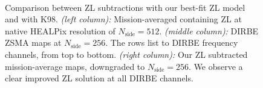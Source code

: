 \documentclass[twocolumn]{aa}
\begin{document}
\begin{figure}
    \\

    \caption{Comparison between ZL subtractions with our best-fit ZL model and with K98. 
    \textit{(left column):} Mission-averaged containing ZL at native HEALPix resolution 
    of $N_\mathrm{side} = 512$. \textit{(middle column):} DIRBE ZSMA maps
    at $N_\mathrm{side} = 256$. The rows list to DIRBE frequency channels, from top to 
    bottom. \textit{(right column):} Our ZL subtracted mission-average 
    maps, downgraded to $N_\mathrm{side} = 256$. We observe a clear improved ZL solution at all DIRBE channels.
    }    
    \label{fig:dr2-zsma-compare2}
\end{figure}
\end{document}
